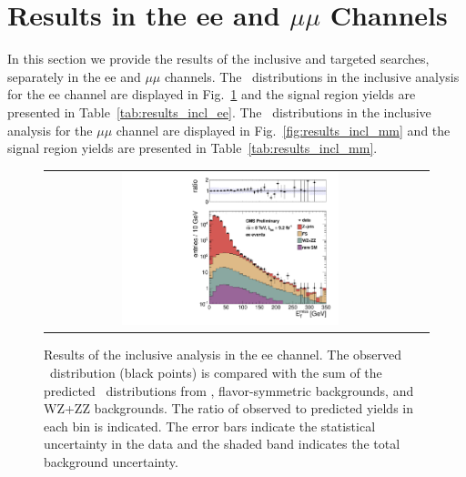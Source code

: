 \clearpage

\section{Results in the ee and $\mu\mu$ Channels}
\label{app:results}

In this section we provide the results of the inclusive and targeted searches, separately in the ee and $\mu\mu$ channels.
The \MET\ distributions in the inclusive analysis for the ee channel are displayed in Fig.~\ref{fig:results_incl_ee} and 
the signal region yields are presented in Table~\ref{tab:results_incl_ee}.
The \MET\ distributions in the inclusive analysis for the $\mu\mu$ channel are displayed in Fig.~\ref{fig:results_incl_mm} and 
the signal region yields are presented in Table~\ref{tab:results_incl_mm}.

\begin{figure}[!h]
\begin{center}
\begin{tabular}{cc}
\includegraphics[width=0.6\textwidth]{plots/pfmet_ee.pdf}
\end{tabular}
\caption{Results of the inclusive analysis in the ee channel. The observed \MET\ distribution (black points) is compared with the sum of the predicted \MET\
distributions from \zjets, flavor-symmetric backgrounds, and WZ+ZZ backgrounds. The ratio of observed to predicted yields in each bin is
indicated. The error bars indicate the statistical uncertainty in the data and the shaded band indicates the total background uncertainty.
\label{fig:results_incl_ee}
}
\end{center}
\end{figure}

